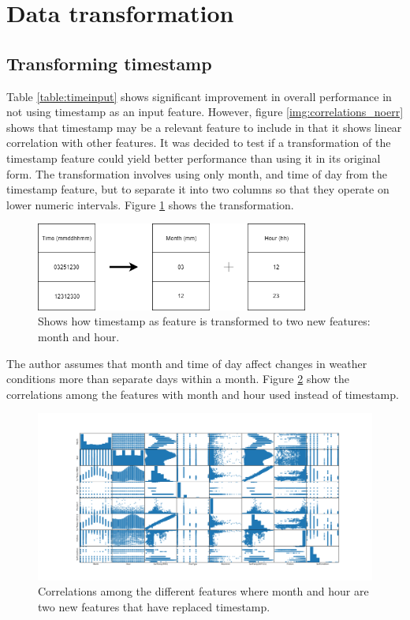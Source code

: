 \section{Data transformation} \label{sec:transformation}

	\subsection{Transforming timestamp}

	Table \ref{table:timeinput} shows significant improvement in overall performance in not using timestamp as an input feature. However, figure \ref{img:correlations_noerr} shows that timestamp may be a relevant feature to include in that it shows linear correlation with other features. It was decided to test if a transformation of the timestamp feature could yield better performance than using it in its original form. The transformation involves using only month, and time of day from the timestamp feature, but to separate it into two columns so that they operate on lower numeric intervals. Figure \ref{img:transformation} shows the transformation. 

\begin{figure}[H] 
	\centering
	\includegraphics[width=0.8\textwidth]{media/transformation_time.png}
	\caption{Shows how timestamp as feature is transformed to two new features: month and hour.}
	\label{img:transformation}
\end{figure}

	The author assumes that month and time of day affect changes in weather conditions more than separate days within a month. Figure \ref{img:correlations_featureengi} show the correlations among the features with month and hour used instead of timestamp. 

\begin{figure}[H] 
	\centering
	\includegraphics[width=1\textwidth]{media/correlations_featureengi_ver5.png}
	\caption{Correlations among the different features where month and hour are two new features that have replaced timestamp. }
	\label{img:correlations_featureengi}
\end{figure}

